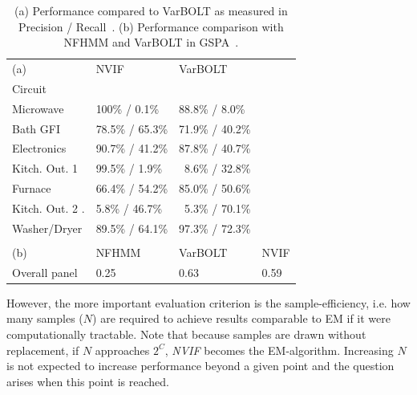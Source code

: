 \begin{table}
\begin{tabular}{llll}
 (a)    & NVIF    & VarBOLT \\
   Circuit                 &  &  \\
                        \hline
                        \hline
    Microwave & 100\% / 0.1\%  & 88.8\% / 8.0\%     \\
    Bath GFI    & 78.5\% / 65.3\% & 71.9\% / 40.2\%      \\
    Electronics     & 90.7\% / 41.2\%    & 87.8\% / 40.7\%  \\
    Kitch. Out. 1 & 99.5\% / 1.9\%       &\ 8.6\% / 32.8\%  \\
    Furnace & 66.4\% / 54.2\%  & 85.0\% / 50.6\%  \\
    Kitch. Out. 2 .& 5.8\% / 46.7\%       & \ 5.3\% / 70.1\%  \\
     Washer/Dryer & 89.5\% / 64.1\%   & 97.3\% / 72.3\% \\
     \hline
     \vspace{0.07cm}\\
      (b)& NFHMM     & VarBOLT & NVIF \\
      \hline
      \hline
      Overall panel & 0.25 & 0.63 & 0.59\\
      \hline
  \end{tabular}
  \caption[NVIF: Performance comparison]{(a) Performance compared to VarBOLT as measured in Precision / Recall~\cite{kolter2012approximate}. (b) Performance comparison with NFHMM and VarBOLT in GSPA~\cite{jia2015fully}.}
  \label{nvif:res}
  \end{table}
  
   However, the more important evaluation criterion is the sample-efficiency, i.e. how many samples ($N$) are required to achieve results comparable to EM if it were computationally tractable. Note that because samples are drawn without replacement, if $N$ approaches $2^C$, \emph{NVIF} becomes the EM-algorithm. Increasing $N$ is not expected to increase performance beyond a given point and the question arises when this point is reached.
   

